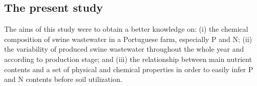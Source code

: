 \subsection{The present study}
The aims of this study were to obtain a better knowledge on: (i) the chemical composition of swine wastewater in a Portuguese farm, especially P and N; (ii) the variability of produced swine wastewater throughout the whole year and according to production stage; and (iii) the relationship between main nutrient contents and a set of physical and chemical properties in order to easily infer P and N contents before soil utilization.